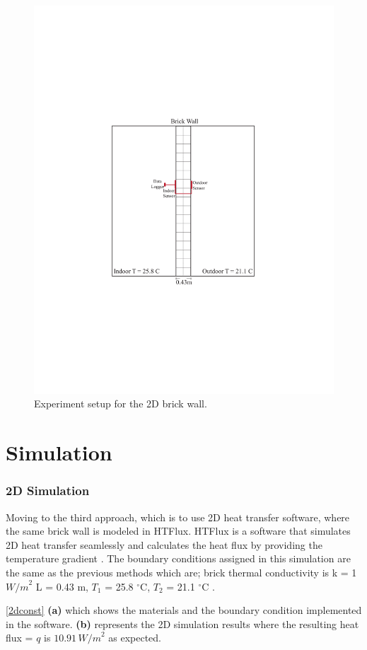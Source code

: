 \begin{figure}[H]
  \centering
  \includegraphics[trim=5.6cm 7.5cm 5.3cm 8cm, clip, width=.6\linewidth]{Figures/2dsection2.pdf}
\caption[2D Section and Setup]{Experiment setup for the 2D brick wall.}
\label{fig:2d2}
\end{figure}




















\section{Simulation}
\subsubsection{2D Simulation}
Moving to the third approach, which is to use 2D heat transfer software, where the same brick wall is modeled in HTFlux. HTFlux is a software that simulates 2D heat transfer seamlessly and calculates the heat flux by providing the temperature gradient \cite{HTflux}. The boundary conditions assigned in this simulation are the same as the previous methods which are; brick thermal conductivity is k = 1 ${W/m}^2$ L = 0.43 m,
$T_1$ = 25.8 $^\circ \text{C}$, 
$T_2$  = 21.1  $^\circ \text{C}$ .


 \ref{2dconst} \textbf{(a)} which shows the materials and the boundary condition implemented in the software. \textbf{(b)} represents the 2D simulation results where the resulting heat flux = \( q \) is \( 10.91 \, {W/m}^2 \) as expected.










